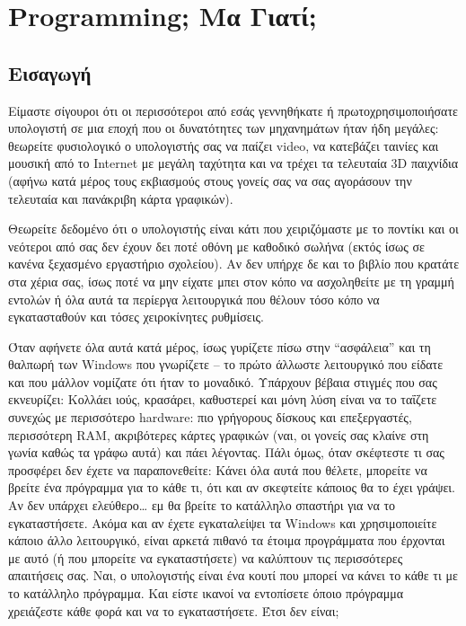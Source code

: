 \chapter{Programming; Μα Γιατί;}
\label{chap:main-intro}
\section{Εισαγωγή}
Είμαστε σίγουροι ότι οι περισσότεροι από εσάς γεννηθήκατε ή
πρωτοχρησιμοποιήσατε υπολογιστή σε μια εποχή που οι δυνατότητες των
μηχανημάτων ήταν ήδη μεγάλες: θεωρείτε φυσιολογικό ο υπολογιστής σας να
παίζει video, να κατεβάζει ταινίες και μουσική από το Internet με μεγάλη
ταχύτητα και να τρέχει τα τελευταία 3D παιχνίδια (αφήνω κατά μέρος τους
εκβιασμούς στους γονείς σας να σας αγοράσουν την τελευταία και πανάκριβη
κάρτα γραφικών).

Θεωρείτε δεδομένο ότι ο υπολογιστής είναι κάτι που χειριζόμαστε με το
ποντίκι και οι νεότεροι από σας δεν έχουν δει ποτέ οθόνη με καθοδικό σωλήνα
(εκτός ίσως σε κανένα ξεχασμένο εργαστήριο σχολείου). Αν δεν υπήρχε δε και
το βιβλίο που κρατάτε στα χέρια σας, ίσως ποτέ να μην είχατε μπει στον
κόπο να ασχοληθείτε με τη γραμμή εντολών ή όλα αυτά τα περίεργα λειτουργικά
που θέλουν τόσο κόπο να εγκατασταθούν και τόσες χειροκίνητες ρυθμίσεις.

Όταν αφήνετε όλα αυτά κατά μέρος, ίσως γυρίζετε πίσω στην ``ασφάλεια'' και τη
θαλπωρή των Windows που γνωρίζετε – το πρώτο άλλωστε λειτουργικό που είδατε
και που μάλλον νομίζατε ότι ήταν το μοναδικό. Υπάρχουν βέβαια στιγμές που
σας εκνευρίζει: Κολλάει ιούς, κρασάρει, καθυστερεί και μόνη λύση είναι να το
ταΐζετε συνεχώς με περισσότερο hardware: πιο γρήγορους δίσκους και
επεξεργαστές, περισσότερη RAM, ακριβότερες κάρτες γραφικών (ναι, οι γονείς
σας κλαίνε στη γωνία καθώς τα γράφω αυτά) και πάει λέγοντας. Πάλι όμως, όταν
σκέφτεστε τι σας προσφέρει δεν έχετε να παραπονεθείτε: Κάνει όλα αυτά που
θέλετε, μπορείτε να βρείτε ένα πρόγραμμα για το κάθε τι, ότι και αν
σκεφτείτε κάποιος θα το έχει γράψει. Αν δεν υπάρχει ελεύθερο\ldots{} εμ θα βρείτε
το κατάλληλο σπαστήρι για να το εγκαταστήσετε.  Ακόμα και αν έχετε
εγκαταλείψει τα Windows και χρησιμοποιείτε κάποιο άλλο λειτουργικό, είναι
αρκετά πιθανό τα έτοιμα προγράμματα που έρχονται με αυτό (ή που μπορείτε να
εγκαταστήσετε) να καλύπτουν τις περισσότερες απαιτήσεις σας. Ναι, ο
υπολογιστής είναι ένα κουτί που μπορεί να κάνει το κάθε τι με το κατάλληλο
πρόγραμμα. Και είστε ικανοί να εντοπίσετε όποιο πρόγραμμα χρειάζεστε κάθε
φορά και να το εγκαταστήσετε. Έτσι δεν είναι;

